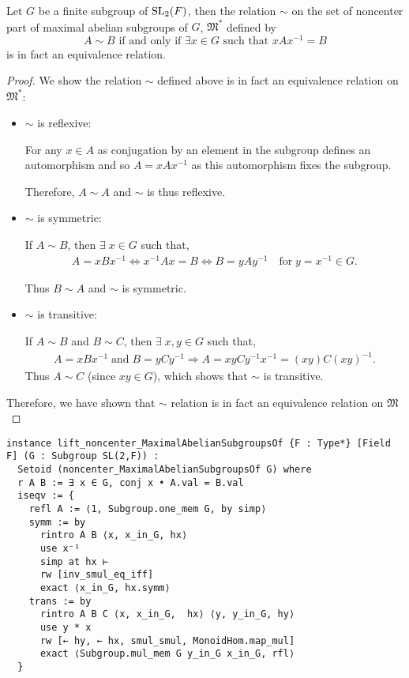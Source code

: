 \begin{lemma}
\label{lift_noncenter_MaximalAbelianSubgroupsOf}
\leanok
 Let $G$ be a finite subgroup of $\operatorname{SL}_2(F)$, then the relation $\sim$ on the set of noncenter part of maximal abelian subgroups of $G$, $\mathfrak{M}^*$ defined by
 \[
 A \sim B \text{ if and only if } \exists x \in G \text{ such that } x A x^{-1} = B
 \]
 is in fact an equivalence relation.
\end{lemma}
\begin{proof}
  \leanok
 We show the relation $\sim$ defined above is in fact an equivalence relation on  $\mathfrak{M}^*$:
\begin{itemize}
\item $\sim$ is reflexive:

For any $x \in A$ as conjugation by an element in the subgroup defines an automorphism and so $A = x A x^{-1}$ as this automorphism fixes the subgroup.

Therefore, $A \sim A$ and $\sim$ is thus reflexive.

\item $\sim$ is symmetric:

If $A \sim B$, then $\exists \; x \in G$ such that,
\begin{align*}
  A = xBx^{-1} \iff x^{-1}Ax = B \iff B = yAy^{-1} \quad \text{for} \; y = x^{-1} \in G.
\end{align*}

Thus $B \sim A$ and $\sim$ is symmetric.\\

\item $\sim$ is transitive:

If $A \sim B$ and $B \sim C$, then $\exists \; x, y \in G$  such that,
\begin{align*} A = xBx^{-1} \; \text{and} \; B = yCy^{-1} \Rightarrow A = xyCy^{-1}x^{-1} = (xy)C(xy)^{-1}.
\end{align*}
Thus $A \sim C$ (since $xy \in G$), which shows that $\sim$ is transitive. \\
\end{itemize}
Therefore, we have shown that $\sim$ relation is in fact an equivalence relation on $\mathfrak{M}$
\end{proof}
\begin{footnotesize}
\begin{verbatim}
instance lift_noncenter_MaximalAbelianSubgroupsOf {F : Type*} [Field F] (G : Subgroup SL(2,F)) :
  Setoid (noncenter_MaximalAbelianSubgroupsOf G) where
  r A B := ∃ x ∈ G, conj x • A.val = B.val
  iseqv := {
    refl A := ⟨1, Subgroup.one_mem G, by simp⟩
    symm := by
      rintro A B ⟨x, x_in_G, hx⟩
      use x⁻¹
      simp at hx ⊢
      rw [inv_smul_eq_iff]
      exact ⟨x_in_G, hx.symm⟩
    trans := by
      rintro A B C ⟨x, x_in_G,  hx⟩ ⟨y, y_in_G, hy⟩
      use y * x
      rw [← hy, ← hx, smul_smul, MonoidHom.map_mul]
      exact ⟨Subgroup.mul_mem G y_in_G x_in_G, rfl⟩
  }
\end{verbatim}
\end{footnotesize}


